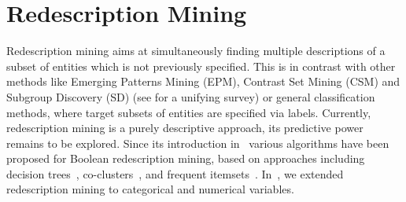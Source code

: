 \section{Redescription Mining}
\label{sec:redescription-mining}

Redescription mining aims at simultaneously finding multiple
descriptions of a subset of entities which is not previously
specified.  This is in contrast with other methods like Emerging
Patterns Mining (EPM), Contrast Set Mining (CSM) and Subgroup
Discovery (SD) (see \cite{kralj09supervised} for a unifying survey) or
general classification methods, where target subsets of entities are
specified via labels.  Currently, redescription mining is a purely
descriptive approach, its predictive power remains to be explored.
Since its introduction in~\cite{ramakrishnan04turning} various
algorithms have been proposed for Boolean redescription mining, based
on approaches including decision
trees~\cite{ramakrishnan04turning,kumar07redescription},
co-clusters~\cite{parida05redescription}, and frequent
itemsets~\cite{gallo08finding}. In~\cite{galbrun12black}, we extended
redescription mining to categorical and numerical variables.

